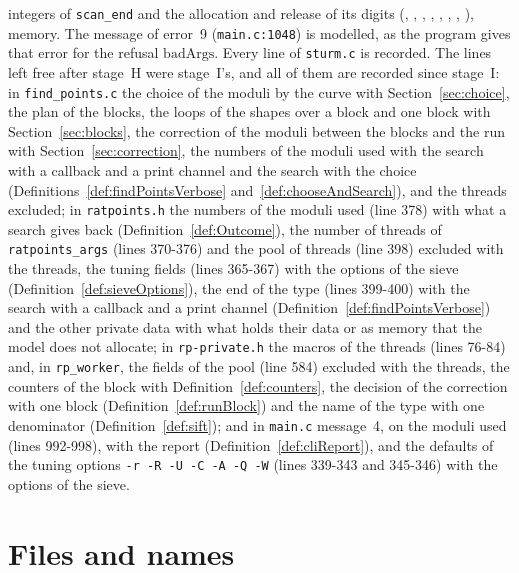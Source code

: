 integers of \verb|scan_end| and the allocation and release of its digits
(, , ,
, , ,
, ), memory. The message of error~9
(\verb|main.c:1048|) is modelled, as the program gives that error for the refusal
$\mathrm{badArgs}$. Every line of \verb|sturm.c| is recorded. The lines left free after stage~H were
stage~I's, and all of them are recorded since stage~I: in \verb|find_points.c| the choice of the
moduli by the curve with Section~\ref{sec:choice}, the plan of the blocks, the loops of the shapes
over a block and one block with Section~\ref{sec:blocks}, the correction of the moduli between the
blocks and the run with Section~\ref{sec:correction}, the numbers of the moduli used with the
search with a callback and a print channel and the search with the choice
(Definitions~\ref{def:findPointsVerbose} and~\ref{def:chooseAndSearch}), and the threads
excluded; in \verb|ratpoints.h| the numbers of the moduli used (line 378) with what a search gives
back (Definition~\ref{def:Outcome}), the number of threads of \verb|ratpoints_args| (lines 370-376)
and the pool of threads (line 398) excluded with the threads, the tuning fields (lines 365-367) with
the options of the sieve (Definition~\ref{def:sieveOptions}), the end of the type (lines 399-400)
with the search with a callback and a print channel (Definition~\ref{def:findPointsVerbose}) and
the other private data with what holds their data or as memory that the model does not allocate;
in \verb|rp-private.h| the macros of the threads (lines 76-84) and, in \verb|rp_worker|, the fields
of the pool (line 584) excluded with the threads, the counters of the block with
Definition~\ref{def:counters}, the decision of the correction with one block
(Definition~\ref{def:runBlock}) and the name of the type with one denominator
(Definition~\ref{def:sift}); and in \verb|main.c| message~4, on the moduli used (lines 992-998),
with the report (Definition~\ref{def:cliReport}), and the defaults of the tuning options
\verb|-r -R -U -C -A -Q -W| (lines 339-343 and 345-346) with the options of the sieve.

\section{Files and names}\label{sec:regionFiles}

